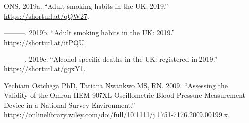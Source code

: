 \documentclass[
  11pt,
  twocolumn]{article}
\newlength{\cslhangindent}
\newlength{\cslentryspacingunit} %
\newenvironment{CSLReferences}[2] %
 {%
  \setlength{\parindent}{0pt}
  \ifodd #1
  \let\oldpar\par
  \def\par{\hangindent=\cslhangindent\oldpar}
  \fi
  \setlength{\parskip}{#2\cslentryspacingunit}
 }%
 {}
\begin{document}
\begin{CSLReferences}{1}{0}
\leavevmode{}%
ONS. 2019a. {``{Adult smoking habits in the UK: 2019}.''}
\url{https://shorturl.at/qQW27}.

\leavevmode{}%
---------. 2019b. {``{Adult smoking habits in the UK: 2019}.''}
\url{https://shorturl.at/itPQU}.

\leavevmode{}%
---------. 2019c. {``{Alcohol-specific deaths in the UK: registered in
2019}.''} \url{https://shorturl.at/gqxY1}.

\leavevmode{}%
Yechiam Ostchega PhD, Tatiana Nwankwo MS, RN. 2009. {``{Assessing the
Validity of the Omron HEM-907XL Oscillometric Blood Pressure Measurement
Device in a National Survey Environment}.''}
\url{https://onlinelibrary.wiley.com/doi/full/10.1111/j.1751-7176.2009.00199.x}.

\end{CSLReferences}
\end{document}
